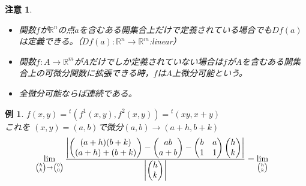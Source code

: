 \documentclass[dvipdfmx,a4j,10pt]{jsarticle}
\theoremstyle{mystyle1}
\theoremstyle{mystyle2}
\newtheorem{example}{例}
\newtheorem{note}{注意}
\begin{document}
\begin{note}\
	\begin{itemize}
		\item 関数$f$が$\mathbb{R}^n$の点$a$を含むある開集合上だけで定義されている場合でも$Df(a)$は定義できる。（$Df(a):\mathbb{R}^n\to\mathbb{R}^m$:linear）
		\item 関数$f:A\to\mathbb{R}^m$が$A$だけでしか定義されていない場合は$f$が$A$を含むある開集合上の可微分関数に拡張できる時，$f$は$A$上微分可能という。
		\item 全微分可能ならば連続である。
	\end{itemize}
\end{note}

\begin{example}
$f(x,y)={}^{t}(f^1(x,y),f^2(x,y))={}^{t}(xy,x+y)$\\
これを	$(x,y)=(a,b)$で微分$(a,b)\to(a+h,b+k)$
\[
\begin{split}
\lim_{
\tiny
\begin{pmatrix}
h \\
k \\
\end{pmatrix}
\to
\begin{pmatrix}
0 \\
0 \\
\end{pmatrix}}
\frac{
\left|
\begin{pmatrix}
(a+h)(b+k) \\
(a+h)+(b+k) \\
\end{pmatrix}
-
\begin{pmatrix}
ab \\
a+b \\
\end{pmatrix}
-
\begin{pmatrix}
b & a \\
1 & 1\\
\end{pmatrix}
\begin{pmatrix}
h \\
k \\
\end{pmatrix}
\right|
}
{\left|\begin{pmatrix}
h \\
k \\
\end{pmatrix}\right|}
&=
\lim_{
\tiny
\begin{pmatrix}
h \\
k \\

\end{pmatrix}}
\end{split}\]
\end{example}
\end{document}
